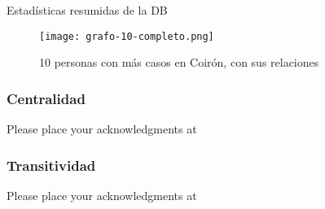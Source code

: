 \begin{table}
	\caption{Estadísticas resumidas de la DB}
	\label{tab:EstadisticasResumidas}
\end{table}

\begin{figure}
	\texttt{[image: grafo-10-completo.png]}
	\caption{10 personas con más casos en Coirón, con sus relaciones} 
	\label{fig:grafoTop10}
\end{figure}

\subsubsection{Centralidad} Please place your acknowledgments at

\subsubsection{Transitividad} Please place your acknowledgments at

